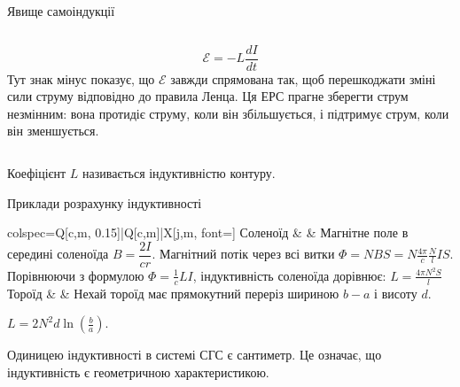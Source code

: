 \documentclass[onlytextwidth]{beamer}
\begin{document}
\begin{frame}{Явище самоіндукції}{}
\begin{columns}
\begin{column}{0.65\linewidth}
\begin{onlyenv}
\begin{block}{}
                    \begin{equation*}
                        \mathcal{E} = - L\frac{dI}{dt}
                    \end{equation*}
                      {\scriptsize Тут знак мінус показує, що $\mathcal{E}$ завжди спрямована так, щоб перешкоджати зміні сили струму відповідно до
                      правила Ленца. Ця ЕРС прагне зберегти струм незмінним: вона протидіє струму, коли він збільшується, і підтримує струм, коли він
                      зменшується.}
    			\end{block}
            \end{onlyenv}
		\end{column}
	\end{columns}
\begin{block}{}
Коефіцієнт $L$ називається \alert{індуктивністю контуру}.
\end{block}
\end{frame}


\begin{frame}{Приклади розрахунку індуктивності}{}
       \begin{tblr}{colspec={Q[c,m, 0.15\linewidth]|Q[c,m]|X[j,m, font=\small]}}
			Соленоїд
			 &
            &
			Магнітне поле в середині соленоїда $B = \dfrac{2I}{c r}$. Магнітний потік через всі витки
            $\Phi = NBS =  N \frac{4\pi}c\frac{N}{l} I S$. Порівнюючи з формулою $\Phi = \frac1c LI$, індуктивність соленоїда дорівнює: $L = \frac{4\pi
            N^2 S}{l}$
			\\\hline
			Тороїд
			 &
            &
            Нехай тороїд має прямокутний переріз шириною $b-a$ і висоту $d$.

            $L = 2N^2d\ln\left( \frac{b}{a}\right) $.
		\end{tblr}
\begin{block}{}\justifying
    Одиницею індуктивності в системі СГС є сантиметр. Це означає, що індуктивність є \alert{геометричною} характеристикою.
\end{block}
\end{frame}
\end{document}
